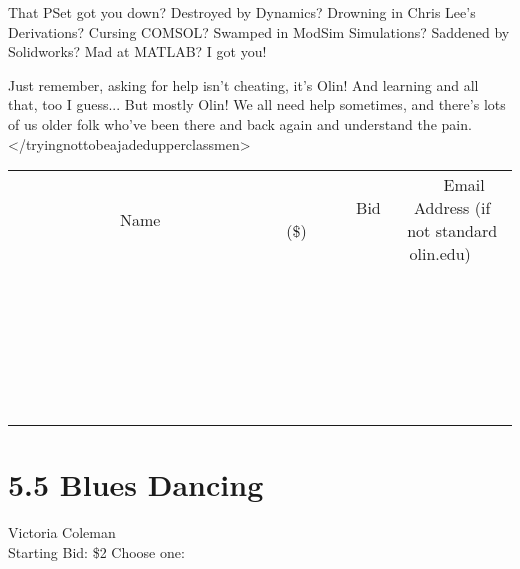 \documentclass[11pt]{article}
\begin{document}
That PSet got you down?  Destroyed by Dynamics?  Drowning in Chris Lee's Derivations?  Cursing COMSOL?  Swamped in ModSim Simulations?  Saddened by Solidworks?  Mad at MATLAB?  I got you!

Just remember, asking for help isn't cheating, it's Olin!  And learning and all that, too I guess... But mostly Olin!  We all need help sometimes, and there's lots of us older folk who've been there and back again and understand the pain. </tryingnottobeajadedupperclassmen>
\\[6ex]
\begin{tabular}{c c c}
~~~~~~~~~~~~~Name~~~~~~~~~~~~~ & ~~~~~~~~~Bid (\$)~~~~~~~~~  & ~~~Email Address (if not standard olin.edu)~~~\\
 & & \\
\hline
 & & \\
\hline
 & & \\
\hline
 & & \\
\hline
 & & \\
\hline
 & & \\
\hline
 & & \\
\hline
 & & \\
\hline
 & & \\
\hline
 & & \\
\hline
 & & \\
\hline
 & & \\
\hline
 & & \\
\hline
 & & \\
\hline
 & & \\
\hline
 & & \\
\hline
 & & \\
\hline
 & & \\
\hline
 & & \\
\hline
 & & \\
\hline
 & & \\
\hline
 & & \\
\hline
 & & \\
\hline
 & & \\
\hline
 & & \\
\hline
 & & \\
\hline
\end{tabular}
\newpage
\section*{5.5 Blues Dancing}
Victoria Coleman
\\
Starting Bid: \$2
\newline
Choose one:
\end{document}
